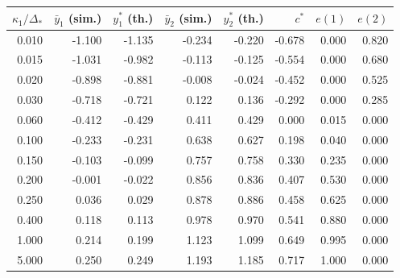 \begin{tabular}{rrrrrrrr}
\toprule
$\kappa_1/\Delta_\ast$ & $\bar y_1$ (sim.) & $y_1^\ast$ (th.) & $\bar y_2$ (sim.) & $y_2^\ast$ (th.) & $c^\ast$ & $e(1)$ & $e(2)$ \\
\midrule
0.010 & -1.100 & -1.135 & -0.234 & -0.220 & -0.678 & 0.000 & 0.820 \\
0.015 & -1.031 & -0.982 & -0.113 & -0.125 & -0.554 & 0.000 & 0.680 \\
0.020 & -0.898 & -0.881 & -0.008 & -0.024 & -0.452 & 0.000 & 0.525 \\
0.030 & -0.718 & -0.721 & 0.122 & 0.136 & -0.292 & 0.000 & 0.285 \\
0.060 & -0.412 & -0.429 & 0.411 & 0.429 & 0.000 & 0.015 & 0.000 \\
0.100 & -0.233 & -0.231 & 0.638 & 0.627 & 0.198 & 0.040 & 0.000 \\
0.150 & -0.103 & -0.099 & 0.757 & 0.758 & 0.330 & 0.235 & 0.000 \\
0.200 & -0.001 & -0.022 & 0.856 & 0.836 & 0.407 & 0.530 & 0.000 \\
0.250 & 0.036 & 0.029 & 0.878 & 0.886 & 0.458 & 0.625 & 0.000 \\
0.400 & 0.118 & 0.113 & 0.978 & 0.970 & 0.541 & 0.880 & 0.000 \\
1.000 & 0.214 & 0.199 & 1.123 & 1.099 & 0.649 & 0.995 & 0.000 \\
5.000 & 0.250 & 0.249 & 1.193 & 1.185 & 0.717 & 1.000 & 0.000 \\
\bottomrule
\end{tabular}
